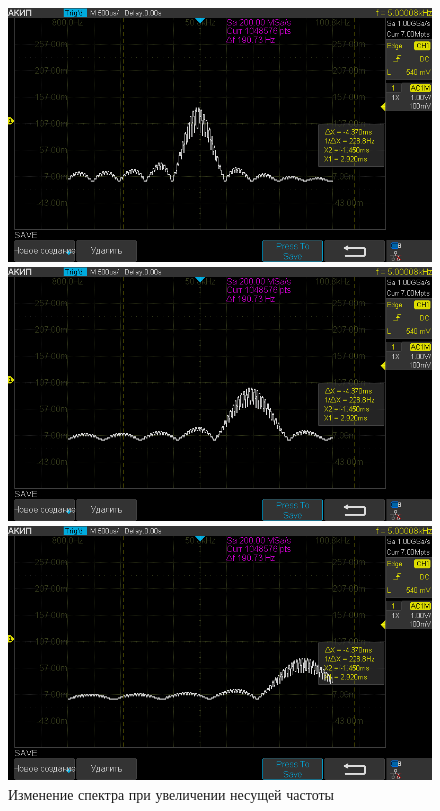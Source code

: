 \begin{figure}[H]
	\centering
	\begin{minipage}[b]{.33\textwidth}
		\centering
		\includegraphics[width=0.9\linewidth]{"../photos/zug1"}
	\end{minipage}%
	\begin{minipage}[b]{.33\textwidth}
		\centering
		\includegraphics[width=0.9\linewidth]{"../photos/zug2"}
	\end{minipage}%
	\begin{minipage}[b]{.33\textwidth}
		\centering
		\includegraphics[width=0.9\linewidth]{"../photos/zug3"}
	\end{minipage}
\caption{Изменение спектра при увеличении несущей частоты}
\label{photo:zug}
\end{figure}

